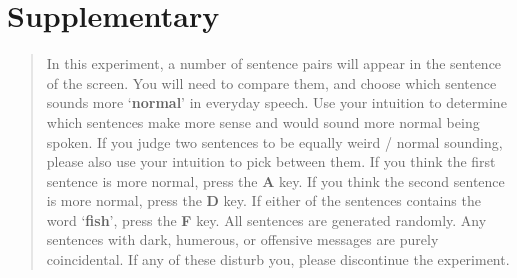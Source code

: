 \documentclass[10pt,letterpaper]{article}
\begin{document}











\section*{Supplementary}

\begin{quote}
In this experiment, a number of sentence pairs will appear in the
sentence of the screen. You will need to compare them, and choose
which sentence sounds more \lq{}\textbf{normal}\rq{} in everyday
speech. Use your intuition to determine which sentences make more
sense and would sound more normal being spoken. If you judge two
sentences to be equally weird / normal sounding, please also use your
intuition to pick between them. If you think the first sentence is
more normal, press the \textbf{A} key. If you think the second
sentence is more normal, press the \textbf{D} key. If either of the
sentences contains the word \lq{}\textbf{fish}\rq{}, press the
\textbf{F} key. All sentences are generated randomly. Any sentences
with dark, humerous, or offensive messages are purely coincidental. If
any of these disturb you, please discontinue the experiment.
\end{quote}
\end{document}
